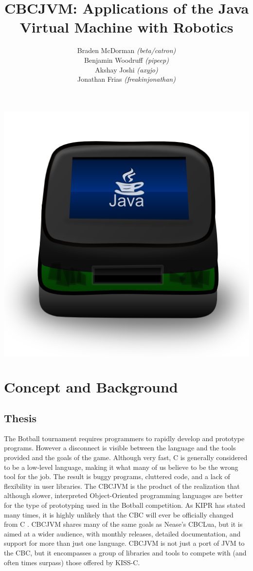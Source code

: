 \documentclass[12pt,letterpaper]{article}
\title{CBCJVM: Applications of the Java Virtual Machine with Robotics}
\author{Braden McDorman \textit{(beta/catron)}\\
Benjamin Woodruff \textit{(pipeep)}\\
Akshay Joshi \textit{(axyjo)}\\
Jonathan Frias \textit{(freakinjonathan)}}
\begin{document}
\makeatletter
\noindent\begin{minipage}[l]{.8\textwidth}\begin{flushleft}\begin{small}
\textbf{\@title}\vspace{.75em}

\@author\vspace{.5em}

\authInfo
\end{small}\end{flushleft}\end{minipage}\vspace{.25in}
\begin{center}
\begin{Large}
\textbf{\@title}
\end{Large}
\par\includegraphics[height=.5in]{CBCJava.png}
\end{center}
\makeatother

\section{Concept and Background}

\subsection{Thesis}

The Botball tournament requires programmers to rapidly develop and prototype programs. However a disconnect is visible between the language and the tools provided and the goals of the game. Although very fast, C is generally considered to be a low-level language, making it what many of us believe to be the wrong tool for the job. The result is buggy programs, cluttered code, and a lack of flexibility in user libraries. The CBCJVM is the product of the realization that although slower, interpreted Object-Oriented programming languages are better for the type of prototyping used in the Botball competition. As KIPR has stated many times, it is highly unlikely that the CBC will ever be officially changed from C \cite{canThereBeCpp}. CBCJVM shares many of the same goals as Nease's CBCLua, but it is aimed at a wider audience, with monthly releases, detailed documentation, and support for more than just one language. CBCJVM is not just a port of JVM to the CBC, but it encompasses a group of libraries and tools to compete with (and often times surpass) those offered by KISS-C.
\end{document}
